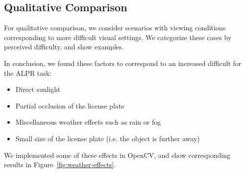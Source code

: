 \subsection{Qualitative Comparison}
For qualitative comparison, we consider scenarios with viewing conditions
corresponding to more difficult visual settings. We categorize these cases by
perceived difficulty, and show examples. 

In conclusion, we found these factors to correspond to an increased difficult
for the \ac{ALPR} task:
\begin{itemize}
    \item Direct sunlight 
    \item Partial occlusion of the license plate 
    \item Miscellaneous weather effects such as rain or fog
    \item Small size of the license plate (i.e. the object is further away)
\end{itemize}

We implemented some of these effects in OpenCV, and show corresponding results
in Figure~\ref{fig:weather-effects}.


